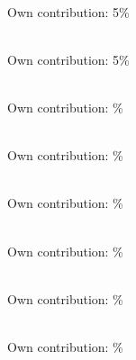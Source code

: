 \noindent{}\\ \strut \hfill Own contribution: 5\%\\

\noindent{}\\ \strut \hfill Own contribution: 5\%\\

\noindent{}\\ \strut \hfill Own contribution: \%\\

\noindent{}\\ \strut \hfill Own contribution: \%\\

\noindent{}\\ \strut \hfill Own contribution: \%\\

\noindent{}\\ \strut \hfill Own contribution: \%\\


\noindent{}\\ \strut \hfill Own contribution: \%\\


\noindent{}\\ \strut \hfill Own contribution: \%\\



